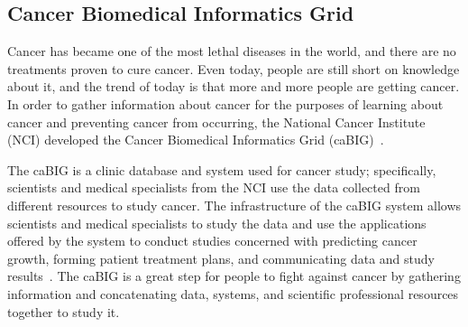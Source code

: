 \subsection{Cancer Biomedical Informatics Grid}
Cancer has became one of the 
most lethal diseases in the world, and there are no treatments 
proven to cure cancer. Even today, people are still short on knowledge 
about it, 
and the trend of today is that more and more people are getting cancer. 
In order to 
gather information about cancer for the purposes of learning about 
cancer and preventing cancer from occurring, the National Cancer 
Institute (NCI) developed the 
Cancer Biomedical Informatics Grid (caBIG)~\cite{Califano}.

The caBIG is a clinic database and system used for cancer study; 
specifically, scientists and medical specialists from the NCI use the 
data collected from different resources to study cancer. The 
infrastructure of the caBIG system allows scientists and 
medical specialists to study the data 
and use the applications offered by the system to conduct studies 
concerned with predicting cancer growth, forming patient treatment plans, 
and communicating data and study results~\cite{Califano}. The caBIG 
is a great step for people to fight against cancer by gathering 
information and concatenating 
data, systems, and scientific professional resources together to study it.

